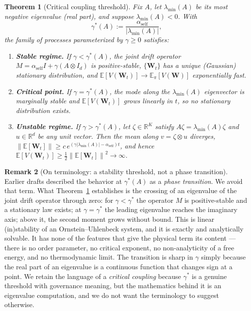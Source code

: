 \documentclass[12pt]{article}
\theoremstyle{plain}
\newtheorem{theorem}{Theorem}[section]
\theoremstyle{definition}
\newtheorem{remark}[theorem]{Remark}
\newcommand{\R}{\mathbb{R}}
\newcommand{\E}{\mathbb{E}}
\newcommand{\W}{\mathbf{W}}
\newcommand{\norm}[1]{\left\lVert #1 \right\rVert}
\newcommand{\abs}[1]{\left| #1 \right|}
\begin{document}
\begin{theorem}[Critical coupling threshold]
  \label{thm:phase}
  Fix $A$, let $\lambda_{\min}(A)$ be its most negative eigenvalue (real
  part), and suppose $\lambda_{\min}(A)<0$.  With
  \[
    \gamma^*(A) := \frac{\alpha_{\mathrm{self}}}{\abs{\lambda_{\min}(A)}},
  \]
  the family of processes parameterized by $\gamma\ge0$ satisfies:
  \begin{enumerate}[label=(\roman*)]
    \item \textbf{Stable regime.} If $\gamma < \gamma^*(A)$, the joint drift
      operator $M=\alpha_{\mathrm{self}} I+\gamma(A\otimes I_d)$ is
      positive-stable, $\{\W_t\}$ has a unique (Gaussian) stationary
      distribution, and $\E[V(\W_t)]\to\E_\pi[V(\W)]$ exponentially fast.
    \item \textbf{Critical point.} If $\gamma = \gamma^*(A)$, the mode along
      the $\lambda_{\min}(A)$ eigenvector is marginally stable and
      $\E[V(\W_t)]$ grows \emph{linearly} in $t$, so no stationary
      distribution exists.
    \item \textbf{Unstable regime.} If $\gamma > \gamma^*(A)$, let
      $\zeta\in\R^K$ satisfy $A\zeta=\lambda_{\min}(A)\zeta$ and $u\in\R^d$
      be any unit vector.  Then the mean along $v=\zeta\otimes u$ diverges,
      $\norm{\E[\W_t]}\ge c\,e^{(\gamma\abs{\lambda_{\min}(A)}-\alpha_{\mathrm{self}})t}$,
      and hence $\E[V(\W_t)]\ge\tfrac12\norm{\E[\W_t]}^2\to\infty$.
  \end{enumerate}
\end{theorem}

\begin{remark}[On terminology: a stability threshold, not a phase transition]
\label{rem:not_phase}
Earlier drafts described the behavior at $\gamma^*(A)$ as a \emph{phase transition}. We avoid that
term. What Theorem~\ref{thm:phase} establishes is the crossing of an eigenvalue of the joint drift
operator through zero: for $\gamma<\gamma^*$ the operator $M$ is positive-stable and a stationary
law exists; at $\gamma=\gamma^*$ the leading eigenvalue reaches the imaginary axis; above it, the
second moment grows without bound. This is linear (in)stability of an Ornstein--Uhlenbeck system,
and it is exactly and analytically solvable. It has none of the features that give the physical term
its content --- there is no order parameter, no critical exponent, no non-analyticity of a free
energy, and no thermodynamic limit. The transition is sharp in $\gamma$ simply because the real part
of an eigenvalue is a continuous function that changes sign at a point. We retain the language of a
\emph{critical coupling} because $\gamma^*$ is a genuine threshold with governance meaning, but the
mathematics behind it is an eigenvalue computation, and we do not want the terminology to suggest
otherwise.
\end{remark}
\end{document}
